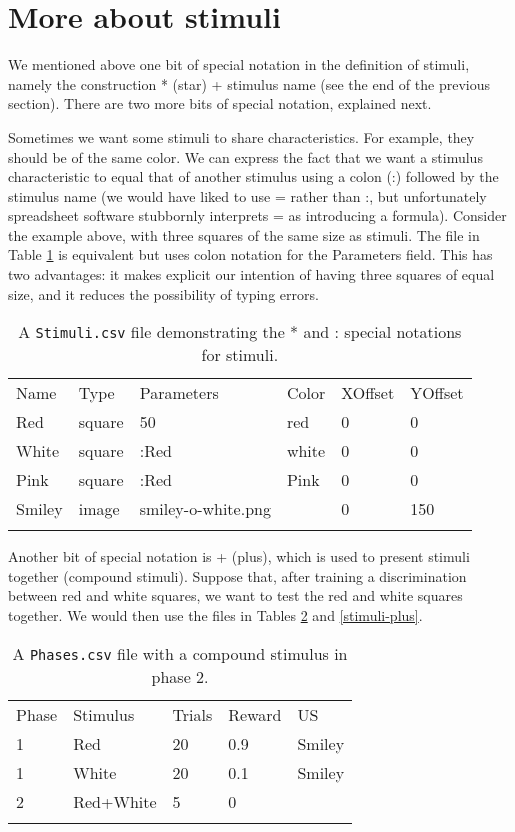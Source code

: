 \documentclass[11pt,]{article}
\renewcommand{\medskip}{}
\begin{document}
\section{More about stimuli}

We mentioned above one bit of special notation in the definition of
stimuli, namely the construction * (star) + stimulus name (see the end
of the previous section). There are two more bits of special notation,
explained next.

Sometimes we want some stimuli to share characteristics. For example,
they should be of the same color. We can express the fact that we want a
stimulus characteristic to equal that of another stimulus using a colon
(:) followed by the stimulus name (we would have liked to use = rather
than :, but unfortunately spreadsheet software stubbornly interprets =
as introducing a formula). Consider the example above, with three
squares of the same size as stimuli. The file in Table
\ref{stimuli-special} is equivalent but uses colon notation for the
Parameters field. This has two advantages: it makes explicit our
intention of having three squares of equal size, and it reduces the
possibility of typing errors.

\begin{longtable}[c]{@{}llllll@{}}
\hline\noalign{\medskip}
Name & Type & Parameters & Color & XOffset & YOffset
\\\noalign{\medskip}
\hline\noalign{\medskip}
Red & square & 50 & red & 0 & 0
\\\noalign{\medskip}
White & square & :Red & white & 0 & 0
\\\noalign{\medskip}
Pink & square & :Red & Pink & 0 & 0
\\\noalign{\medskip}
Smiley & image & smiley-o-white.png & & 0 & 150
\\\noalign{\medskip}
\hline
\noalign{\medskip}
\caption{A \texttt{Stimuli.csv} file demonstrating the * and : special
notations for stimuli. \label{stimuli-special}}
\end{longtable}

Another bit of special notation is + (plus), which is used to present
stimuli together (compound stimuli). Suppose that, after training a
discrimination between red and white squares, we want to test the red
and white squares together. We would then use the files in Tables
\ref{phases-plus} and \ref{stimuli-plus}.

\begin{longtable}[c]{@{}lllll@{}}
\hline\noalign{\medskip}
Phase & Stimulus & Trials & Reward & US
\\\noalign{\medskip}
\hline\noalign{\medskip}
1 & Red & 20 & 0.9 & Smiley
\\\noalign{\medskip}
1 & White & 20 & 0.1 & Smiley
\\\noalign{\medskip}
2 & Red+White & 5 & 0 &
\\\noalign{\medskip}
\hline
\noalign{\medskip}
\caption{A \texttt{Phases.csv} file with a compound stimulus in phase 2.
\label{phases-plus}}
\end{longtable}
\end{document}
